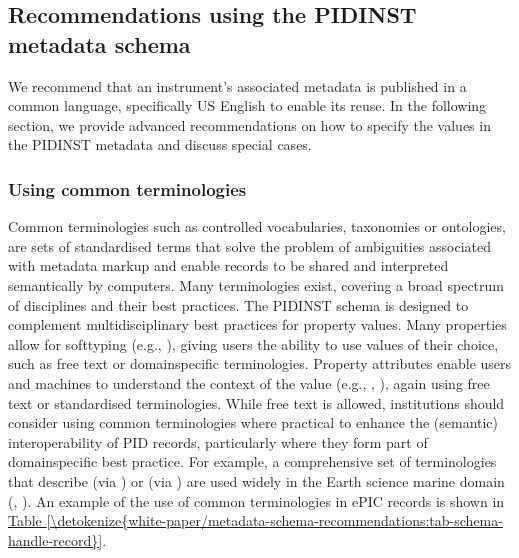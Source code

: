 \documentclass[a4paper,10pt,english]{sphinxmanual}
\begin{document}
\subsection{Recommendations using the PIDINST metadata schema}
\label{\detokenize{white-paper/metadata-schema-recommendations:recommendations-using-the-pidinst-metadata-schema}}\label{\detokenize{white-paper/metadata-schema-recommendations:pidinst-metadata-schema-recommendations}}\label{\detokenize{white-paper/metadata-schema-recommendations::doc}}
\sphinxAtStartPar
We recommend that an instrument’s associated metadata is published in
a common language, specifically US English to enable its reuse.  In
the following section, we provide advanced recommendations on how to
specify the values in the PIDINST metadata and discuss special cases.


\subsubsection{Using common terminologies}
\label{\detokenize{white-paper/metadata-schema-recommendations:using-common-terminologies}}\label{\detokenize{white-paper/metadata-schema-recommendations:pidinst-metadata-schema-terminologies}}
\sphinxAtStartPar
Common terminologies such as controlled vocabularies, taxonomies or
ontologies, are sets of standardised terms that solve the problem of
ambiguities associated with metadata markup and enable records to be
shared and interpreted semantically by computers.  Many terminologies
exist, covering a broad spectrum of disciplines and their best
practices.  The PIDINST schema is designed to complement
multidisciplinary best practices for property values.  Many properties
allow for soft\sphinxhyphen{}typing (e.g., ), giving users the ability to
use values of their choice, such as free text or domain\sphinxhyphen{}specific
terminologies.  Property attributes enable users and machines to
understand the context of the value (e.g., ,
), again using free text or standardised
terminologies.  While free text is allowed, institutions should
consider using common terminologies where practical to enhance the
(semantic) interoperability of PID records, particularly where they
form part of domain\sphinxhyphen{}specific best practice.  For example, a
comprehensive set of terminologies that describe  (via
) or  (via ) are
used widely in the Earth science marine domain
(,
).
An example of the use of common terminologies in ePIC records is shown
in \hyperref[\detokenize{white-paper/metadata-schema-recommendations:tab-schema-handle-record}]{Table \ref{\detokenize{white-paper/metadata-schema-recommendations:tab-schema-handle-record}}}.
\end{document}
